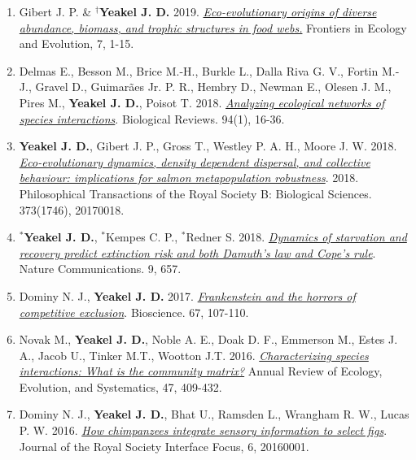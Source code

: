 \documentclass[margin,line,12pt]{res}
\begin{document}
\begin{resume}
\begin{enumerate}
\item Gibert J. P. \& \textbf{${}^\dag$Yeakel J. D.} 2019. \href{https://www.frontiersin.org/articles/10.3389/fevo.2019.00015/full}{\emph{Eco-evolutionary origins of diverse abundance, biomass, and trophic structures in food webs.}} Frontiers in Ecology and Evolution, 7, 1-15.
  
\item Delmas E., Besson M., Brice M.-H., Burkle L., Dalla Riva G. V., Fortin M.-J., Gravel D., Guimar\~aes Jr. P. R., Hembry D., Newman E., Olesen J. M., Pires M., \textbf{Yeakel J. D.}, Poisot T. 2018. \href{https://onlinelibrary.wiley.com/doi/abs/10.1111/brv.12433}{\emph{Analyzing ecological networks of species interactions}}. Biological Reviews. 94(1), 16-36.

\item \textbf{Yeakel J. D.}, Gibert J. P., Gross T., Westley P. A. H., Moore J. W. 2018. \href{https://royalsocietypublishing.org/doi/10.1098/rstb.2017.0018}{\emph{Eco-evolutionary dynamics, density dependent dispersal, and collective behaviour: implications for salmon metapopulation robustness}}. 2018. Philosophical Transactions of the Royal Society B: Biological Sciences. 373(1746), 20170018.

\item \textbf{${}^\ast$Yeakel J. D.}, ${}^\ast$Kempes C. P., ${}^\ast$Redner S. 2018. \href{https://www.nature.com/articles/s41467-018-02822-y}{\emph{Dynamics of starvation and recovery predict extinction risk and both Damuth's law and Cope's rule}}. Nature Communications. 9, 657.

\item Dominy N. J., \textbf{Yeakel J. D.} 2017. \href{https://academic.oup.com/bioscience/article-pdf/67/2/107/10251235/biw133.pdf}{\emph{Frankenstein and the horrors of competitive exclusion}}. Bioscience. 67, 107-110.

\item Novak M., \textbf{Yeakel J. D.}, Noble A. E., Doak D. F., Emmerson M., Estes J. A., Jacob U., Tinker M.T., Wootton J.T. 2016. \href{https://pubs.er.usgs.gov/publication/70173930}{\emph{Characterizing species interactions: What is the community matrix?}} Annual Review of Ecology, Evolution, and Systematics, 47, 409-432.

\item Dominy N. J., \textbf{Yeakel J. D.}, Bhat U., Ramsden L., Wrangham R. W., Lucas P. W. 2016. \href{https://royalsocietypublishing.org/doi/full/10.1098/rsfs.2016.0001}{\emph{How chimpanzees integrate sensory information to select figs}}. Journal of the Royal Society Interface Focus, 6, 20160001.


\end{enumerate}
\end{resume}
\end{document}
